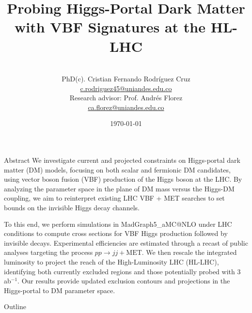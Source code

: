 \documentclass{../../bredelebeamer}
\title[Higgs-Portal DM with VBF at HL-LHC]{Probing Higgs-Portal Dark Matter with VBF Signatures at the HL-LHC}
\subtitle{}
\author[C. Rodríguez]{%
    \vspace{2em}\\
    PhD(c). Cristian Fernando Rodríguez Cruz\inst{1}\\
    \href{mailto:c.rodriguez45@uniandes.edu.co}{c.rodriguez45@uniandes.edu.co}\\
    $$ $$
    Research advisor: Prof. Andrés Florez\inst{1}\\
    \href{mailto:ca.florez@uniandes.edu.co}{ca.florez@uniandes.edu.co}\\
    \vspace{1em}
}
\institute[Uniandes]{\inst{1} Universidad de los Andes\and
}
\date{\today}
\begin{document}
\begin{frame}
    \titlepage
\end{frame}
\begin{frame}{Abstract}
    \justifying
    We investigate current and projected constraints on Higgs-portal dark matter (DM) models, focusing on both scalar and fermionic DM candidates, using vector boson fusion (VBF) production of the Higgs boson at the LHC. By analyzing the parameter space in the plane of DM mass versus the Higgs-DM coupling, we aim to reinterpret existing LHC VBF + MET searches to set bounds on the invisible Higgs decay channels.

    \vfill

    To this end, we perform simulations in MadGraph5\_aMC@NLO under LHC conditions to compute cross sections for VBF Higgs production followed by invisible decays. Experimental efficiencies are estimated through a recast of public analyses targeting the process $pp \to jj + \text{MET}$. We then rescale the integrated luminosity to project the reach of the High-Luminosity LHC (HL-LHC), identifying both currently excluded regions and those potentially probed with 3 ab$^{-1}$. Our results provide updated exclusion contours and projections in the Higgs-portal to DM parameter space.
\end{frame}

\begin{frame}{Outline}
    \tableofcontents
\end{frame}
\end{document}
